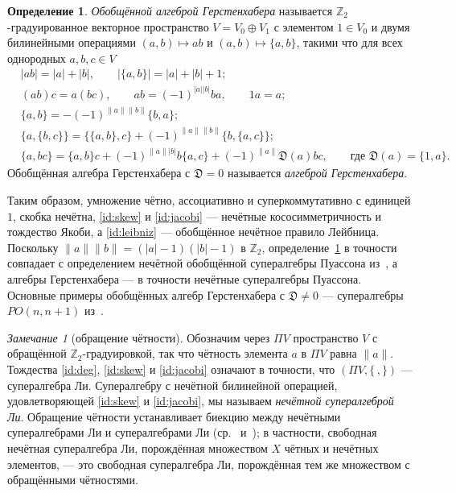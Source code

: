 \documentclass[11pt,reqno]{amsart}
\newcommand{\Z}{\mathbb Z}
\newcommand{\D}{\mathfrak D}
\newcommand{\rp}[1]{\|#1\|}
\theoremstyle{plain}
\theoremstyle{definition}
\newtheorem{definition}[theorem]{Определение}
\theoremstyle{remark}
\newtheorem{remark}[theorem]{Замечание}
\begin{document}
\begin{definition}\label{def}
\emph{Обобщённой алгеброй Герстенхабера} называется $\Z_2$-градуированное векторное пространство $V=V_0\oplus V_1$ с элементом $1\in V_0$ и двумя билинейными операциями $(a,b)\mapsto ab$ и $(a,b)\mapsto\{a,b\}$, такими что для всех однородных $a,b,c\in V$
\begin{align}
&|ab|=|a|+|b|,\qquad |\{a,b\}|=|a|+|b|+1;\label{id:deg}\\
&(ab)c=a(bc),\qquad ab=(-1)^{|a||b|}ba,\qquad 1a=a;\label{id:comm}\\
&\{a,b\}=-(-1)^{\rp a\rp b}\{b,a\};\label{id:skew}\\
&\{a,\{b,c\}\}=\{\{a,b\},c\}+(-1)^{\rp a\rp b}\{b,\{a,c\}\};\label{id:jacobi}\\
&\{a,bc\}=\{a,b\}c+(-1)^{\rp a|b|}b\{a,c\}+(-1)^{\rp a}\D(a)bc,\qquad\text{где } \D(a)=\{1,a\}.\label{id:leibniz}
\end{align}
Обобщённая алгебра Герстенхабера с $\D=0$ называется \emph{алгеброй Герстенхабера}.
\end{definition}

Таким образом, умножение чётно, ассоциативно и суперкоммутативно с единицей $1$, скобка нечётна, \eqref{id:skew} и \eqref{id:jacobi} --- нечётные кососимметричность и тождество Якоби, а \eqref{id:leibniz} --- обобщённое нечётное правило Лейбница.
Поскольку $\rp a\rp b=(|a|-1)(|b|-1)$ в $\Z_2$, определение~\ref{def} в точности совпадает с определением нечётной обобщённой супералгебры Пуассона из~\cite[(0.14)]{CK10}, а алгебры Герстенхабера --- в точности нечётные супералгебры Пуассона.
Основные примеры обобщённых алгебр Герстенхабера с $\D\neq0$ --- супералгебры $PO(n,n+1)$ из~\cite{CK10}.

\begin{remark}[обращение чётности]\label{rem:parity}
Обозначим через $\Pi V$ пространство $V$ с обращённой $\Z_2$-градуировкой, так что чётность элемента $a$ в $\Pi V$ равна $\rp a$.
Тождества \eqref{id:deg}, \eqref{id:skew} и \eqref{id:jacobi} означают в точности, что $(\Pi V,\{\,,\})$ --- супералгебра Ли.
Супералгебру с нечётной билинейной операцией, удовлетворяющей \eqref{id:skew} и \eqref{id:jacobi}, мы называем \emph{нечётной супералгеброй Ли}.
Обращение чётности устанавливает биекцию между нечётными супералгебрами Ли и супералгебрами Ли (ср.~\cite{Kac77} и~\cite[замечание~1.3]{CK10}); в частности, свободная нечётная супералгебра Ли, порождённая множеством $X$ чётных и нечётных элементов, --- это свободная супералгебра Ли, порождённая тем же множеством с обращёнными чётностями.
\end{remark}
\end{document}
